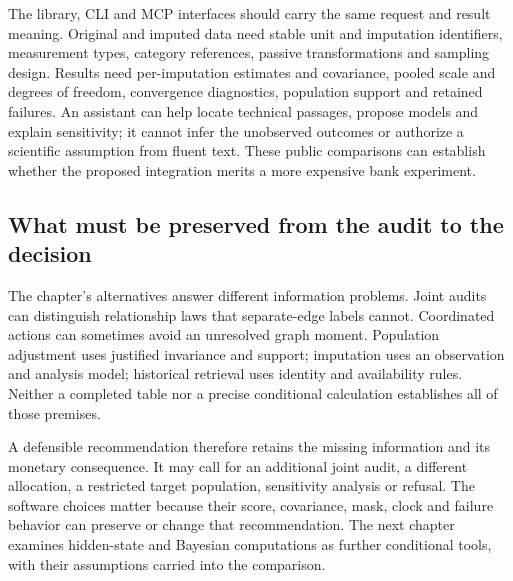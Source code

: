 The library, CLI and MCP interfaces should carry the same request and result
meaning. Original and imputed data need stable unit and imputation identifiers,
measurement types, category references, passive transformations and sampling
design. Results need per-imputation estimates and covariance, pooled scale and
degrees of freedom, convergence diagnostics, population support and retained
failures. An assistant can help locate technical passages, propose models and
explain sensitivity; it cannot infer the unobserved outcomes or authorize a
scientific assumption from fluent text. These public comparisons can establish
whether the proposed integration merits a more expensive bank experiment.


\subsection{What must be preserved from the audit to the decision}

The chapter's alternatives answer different information problems. Joint audits
can distinguish relationship laws that separate-edge labels cannot. Coordinated
actions can sometimes avoid an unresolved graph moment. Population adjustment
uses justified invariance and support; imputation uses an observation and
analysis model; historical retrieval uses identity and availability rules.
Neither a completed table nor a precise conditional calculation establishes
all of those premises.

A defensible recommendation therefore retains the missing information and its
monetary consequence. It may call for an additional joint audit, a different
allocation, a restricted target population, sensitivity analysis or refusal.
The software choices matter because their score, covariance, mask, clock and
failure behavior can preserve or change that recommendation. The next chapter
examines hidden-state and Bayesian computations as further conditional tools,
with their assumptions carried into the comparison.

